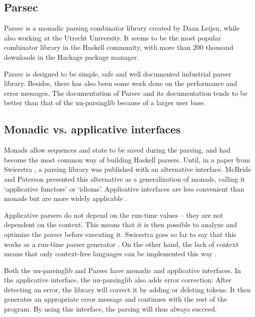 \subsection{Parsec}
%
Parsec is a monadic parsing combinator library created by Daan Leijen, while also working at the Utrecht University.
It seems to be the most popular combinator library in the Haskell community, with more than 200 thousand downloads in the Hackage package manager.

Parsec is designed to be simple, safe and well documented industrial parser library.
Besides, there has also been some work done on the performance and error messages.
The documentation of Parsec and its documentation tends to be better than that of the uu-parsinglib because of a larger user base.


\subsection{Monadic vs. applicative interfaces}
Monads allow sequences and state to be saved during the parsing, and had become the most common way of building Haskell parsers.
Until, in a paper from Swierstra , a parsing library was published with an alternative interface.
McBride and Paterson presented this alternative as a generalization of monads, calling it `applicative functors' or `idioms'.
Applicative interfaces are less convenient than monads but are more widely applicable .

Applicative parsers do not depend on the run-time values -- they are not dependent on the context.
This means that it is then possible to analyze and optimize the parser before executing it.
Swierstra goes so far to say that this works as a run-time parser generator .
On the other hand, the lack of context means that only context-free languages can be implemented this way .

Both the uu-parsinglib and Parsec have monadic and applicative interfaces.
In the applicative interface, the uu-parsinglib also adds error correction:
After detecting an error, the library will correct it by adding or deleting tokens.
It then generates an appropriate error message and continues with the rest of the program.
By using this interface, the parsing will thus always succeed.

